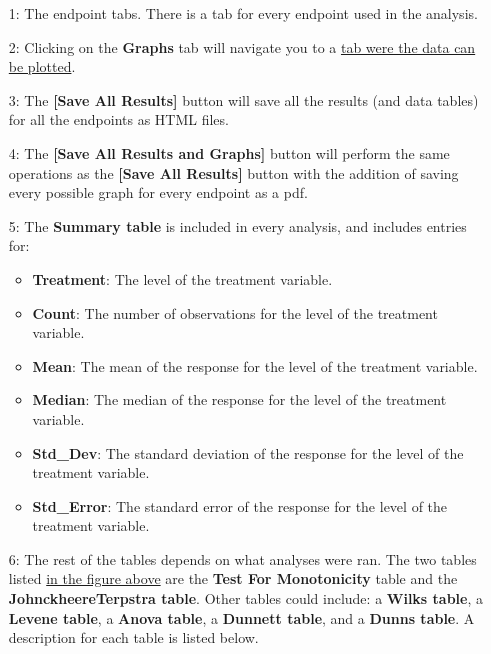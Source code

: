\documentclass[a4paper]{article}
\begin{document}
\begin{enumerate}	
	
	\item[\begingroup\color{red}1:\endgroup] The endpoint tabs.  There is a tab for every endpoint used in the analysis.  

	\item[\begingroup\color{red}2:\endgroup] Clicking on the \textbf{Graphs} tab will navigate you to a 
		\hyperlink{Sec:GraphTab}{tab were the data can be plotted}.    
	
	\item[\begingroup\color{red}3:\endgroup] The \textbf{[Save All Results]} button will save all the 
		results (and data tables) for all the endpoints as HTML files.
	
	\item[\begingroup\color{red}4:\endgroup] The \textbf{[Save All Results and Graphs]} button will perform the 
		same operations as the \textbf{[Save All Results]} button with the addition of saving every possible 
		graph for every endpoint as a pdf.  
	
	\item[\begingroup\color{red}5:\endgroup] The \textbf{Summary table} is included in every analysis, and includes entries for:
		\begin{itemize}
			\item \textbf{Treatment}: The level of the treatment variable.
			\item \textbf{Count}: The number of observations for the level of the treatment variable.
			\item \textbf{Mean}:  The mean of the response for the level of the treatment variable.
			\item \textbf{Median}: The median of the response for the level of the treatment variable.
			\item \textbf{Std\_Dev}: The standard deviation of the response for the level of the treatment variable.
			\item \textbf{Std\_Error}: The standard error of the response for the level of the treatment variable.
		\end{itemize}
		
	\item[\begingroup\color{red}6:\endgroup] The rest of the tables depends on what analyses were ran.  The two tables 
		listed \hyperlink{fig:OEResults}{in the figure above} are the \textbf{Test For Monotonicity} table and 
		the \textbf{Johnckheere\textendash{}Terpstra table}. Other tables could include: a \textbf{Wilks table}, 
		a \textbf{Levene table}, a \textbf{Anova table}, a \textbf{Dunnett table}, and a \textbf{Dunns table}.  
		A description for each table is listed below.
		

\end{enumerate}
\end{document}
